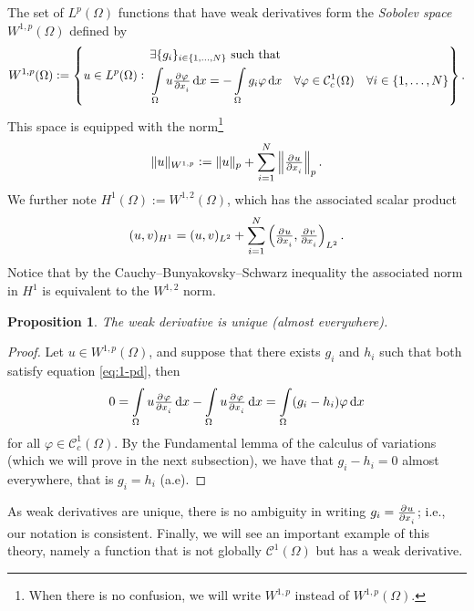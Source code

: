 \documentclass[a4paper,doc,11pt]{article}
\newtheorem{proposition}{Proposition}[theorem]
\newcommand{\CC}{\mathcal{C}}
\begin{document}
The set of \(L^p (\Omega)\) functions that have weak derivatives form the \emph{Sobolev space} \( W^{1,p} (\Omega)\) defined by
\[
    W^{1,p} (\Omega) :=
    \left\{
        u \in L^p (\Omega): \,
        \begin{aligned}
        &\exists \{g_i\}_{i\in \{1,\ldots, N\}} \text{ such that } 
        \\
        &\int\limits_\Omega u \pd{\varphi}{x_i} \dif x = -\int\limits_\Omega g_i \varphi \dif x \quad \forall \varphi \in \CC_c^1 (\Omega) \quad \forall i \in \{1,\ldots,N\}
        \end{aligned}
    \right\}.
\]
This space is equipped with the norm\footnote{When there is no confusion, we will write \(W^{1,p}\) instead of \(W^{1,p} (\Omega)\).}
\[
    \|u\|_{W^{1,p}} :=  \|u\|_p + \sum_{i=1}^N \left\| \pd{u}{x_i} \right\|_p.
\]
We further note \(H^1(\Omega) := W^{1,2}(\Omega)\), which has the associated scalar product
\[
    (u,v)_{H^1} = (u,v)_{L^2} + \sum_{i=1}^N \left( \pd{u}{x_i} , \pd{v}{x_i} \right)_{L^2}.
\]
Notice that by the Cauchy–Bunyakovsky–Schwarz inequality the associated norm in  \(H^1\) is equivalent to the \(W^{1,2}\) norm.

\begin{proposition}
    The weak derivative is unique (almost everywhere).
\end{proposition}
\begin{proof}
    Let \(u \in W^{1,p}(\Omega)\), and suppose that there exists \(g_i\) and \( h_i\) such that both satisfy equation \eqref{eq:1-pd}, then
    \[
        0 = \int\limits_\Omega u \pd{\varphi}{x_i} \dif x - \int\limits_\Omega u \pd{\varphi}{x_i} \dif x = \int\limits_\Omega (g_i - h_i) \varphi \dif x
    \]
    for all \(\varphi \in \CC_c^1 (\Omega)\). By the Fundamental lemma of the calculus of variations (which we will prove in the next subsection), we have that \( g_i - h_i = 0\) almost everywhere, that is \( g_i = h_i\) (a.e).
\end{proof}

As weak derivatives are unique, there is no ambiguity in writing \(g_i = \pd{u}{x_i}\); i.e., our notation is consistent. Finally, we will see an important example of this theory, namely a function that is not globally \(\CC^1(\Omega)\) but has a weak derivative.
\end{document}
